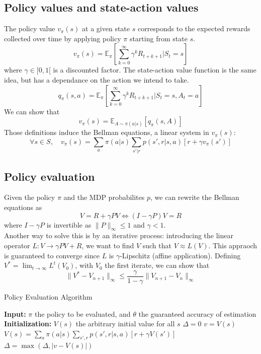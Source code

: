 \documentclass[12pt, openany]{report}
\newcommand{\E}{\mathbb{E}}
\theoremstyle{definition}
\begin{document}
\subsection{Policy values and state-action values}
The policy value $v_\pi(s)$ at a given state $s$ corresponds to the expected rewards collected over time by applying policy $\pi$ starting from state $s$. 
\begin{equation}
	v_\pi(s) = \E_\pi \left[\sum_{k=0}^\infty \gamma^k R_{t+k+1}|S_t=s\right] 
\end{equation}
where $\gamma \in [0,1[$ is a discounted factor. The state-action value function is the same idea, but has a dependance on the action we intend to take.
\begin{equation}
	q_\pi(s,a) = \E_\pi \left[\sum_{k=0}^\infty \gamma^k R_{t+k+1}|S_t=s,A_t=a\right]
\end{equation}
We can show that 
\begin{equation}
	v_\pi(s) = \E_{A\sim \pi(a|s)}[q_\pi(s,A)]
\end{equation}
Those definitions induce the Bellman equations, a linear system in $v_\pi(s)$:
\begin{equation}\label{eq:bellman}
	\forall s\in S,\quad v_\pi(s) = \sum_a \pi(a|s) \sum_{s'|r}p(s',r|s,a)[r+\gamma v_\pi(s')]
\end{equation}
\subsection{Policy evaluation}
Given the policy $\pi$ and the MDP probabilites $p$, we can rewrite the Bellman equations as 
\begin{equation}
	V=R+\gamma PV \Longleftrightarrow (I-\gamma P)V = R
\end{equation}
where $I-\gamma P$ is invertible as $\|P\|_\infty \le 1$ and $\gamma < 1$. \\
Another way to solve this is by an iterative process: introducing the linear operator $L:V\to \gamma PV+R$, we want to find $V$ such that $V\approx L(V)$. This appraoch is guaranteed to converge since $L$ is $\gamma$-Lipschitz (affine application). Defining $V^* = \lim_{t\to \infty} L^t(V_0)$, with $V_0$ the first iterate, we can show that 
\begin{equation}
	\|V^*-V_{n+1}\|_{\infty} \le \frac{\gamma}{1-\gamma}\|V_{n+1}-V_n\|_\infty 
\end{equation}
\begin{algorithm}[H]
	\caption{Policy Evaluation Algorithm}
	\begin{algorithmic}[1]
		\State \textbf{Input:} $\pi$ the policy to be evaluated, and $\theta$ the guaranteed accuracy of estimation
		\State \textbf{Initialization:} $V(s)$ the arbitrary initial value for all $s$ 
		\While {$\Delta \ge \theta$}
		\State $\Delta =0$
		\State $v = V(s)$
		\State $V(s) = \sum_a\pi(a|s)\sum_{s',r} p(s',r|s,a)[r+\gamma V(s')]$
		\State $\Delta = \max(\Delta, |v-V(s)|)$
		\EndFor
		\EndWhile
	\end{algorithmic}
\end{algorithm}
\end{document}
